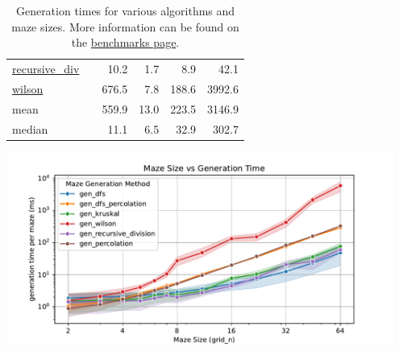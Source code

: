\documentclass[10pt,a4paper,onecolumn]{article}
\let\origfigure\figure
\let\endorigfigure\endfigure
\renewenvironment{figure}[1][2] {
    \expandafter\origfigure\expandafter[H]
} {
    \endorigfigure
}
\begin{document}
\begin{table}[H]
\begin{tabular}{|ll|r|rrr|}
  \href{https://understanding-search.github.io/maze-dataset/maze_dataset.html\#LatticeMazeGenerators.gen_recursive_division}{recursive\_div}
          &                        &   10.2   &    1.7   &    8.9   &   42.1   \\
  \href{https://understanding-search.github.io/maze-dataset/maze_dataset.html\#LatticeMazeGenerators.gen_wilson}{wilson}
          &                        &  676.5   &    7.8   &  188.6   & 3992.6   \\
  \hline\hline
  mean
          &                        &  559.9   &   13.0   &  223.5   & 3146.9   \\
  median
          &                        &   11.1   &    6.5   &   32.9   &  302.7   \\
  \hline
\end{tabular}
\caption{Generation times for various algorithms and maze sizes. More information can be found on the \href{https://understanding-search.github.io/maze-dataset/benchmarks}{benchmarks page}.}
\label{tab:benchmarks}
\end{table}

\begin{figure}
\hypertarget{fig:benchmarks}{%
\centering
\includegraphics[width=0.95\textwidth,height=\textheight]{figures/benchmarks/gridsize-vs-gentime.pdf}
\caption{Plot of maze generation time. Generation time scales
exponentially with maze size for all algorithms. Generation time per
maze does not depend on the number of mazes being generated, and there
is minimal overhead to initializing the generation process for a small
dataset. Wilson's algorithm is notably less efficient than others and
has high variance. Note that values are averaged across all parameter
sets for that algorithm. More information can be found on the
\href{https://understanding-search.github.io/maze-dataset/benchmarks/}{benchmarks
page}.}\label{fig:benchmarks}
}
\end{figure}
\end{document}
